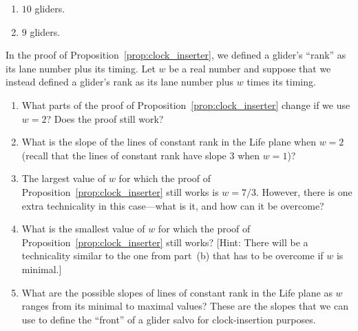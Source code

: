 \begin{multicols}{2}
\begin{problem}
\begin{enumerate}[label=(\alph*)]
		\item $10$ gliders.
		
		\item $9$ gliders.
	\end{enumerate}
\end{problem}


\mfilbreak


\begin{problem}\label{exer:slow_salvo_clock_slope}
	In the proof of Proposition~\ref{prop:clock_inserter}, we defined a glider's ``rank'' as its lane number plus its timing. Let $w$ be a real number and suppose that we instead defined a glider's rank as its lane number plus $w$ times its timing.
	\begin{enumerate}[label=(\alph*)]
		\item What parts of the proof of Proposition~\ref{prop:clock_inserter} change if we use $w = 2$? Does the proof still work?
		
		\item What is the slope of the lines of constant rank in the Life plane when $w = 2$ (recall that the lines of constant rank have slope $3$ when $w = 1$)?
		
		\item The largest value of $w$ for which the proof of Proposition~\ref{prop:clock_inserter} still works is $w = 7/3$. However, there is one extra technicality in this case---what is it, and how can it be overcome?
		
		\item What is the smallest value of $w$ for which the proof of Proposition~\ref{prop:clock_inserter} still works? [Hint: There will be a technicality similar to the one from part~(b) that has to be overcome if $w$ is minimal.]
		
		\item What are the possible slopes of lines of constant rank in the Life plane as $w$ ranges from its minimal to maximal values? These are the slopes that we can use to define the ``front'' of a glider salvo for clock-insertion purposes.
	\end{enumerate}
\end{problem}


\mfilbreak



\end{multicols}
